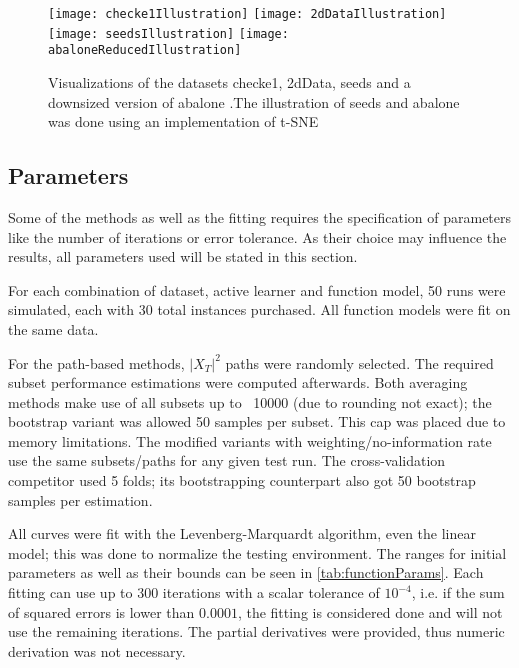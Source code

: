 \begin{figure}[h]
	\centering
	\texttt{[image: checke1Illustration]}
	\texttt{[image: 2dDataIllustration]}
	\texttt{[image: seedsIllustration]}
	\texttt{[image: abaloneReducedIllustration]}
	\caption{Visualizations of the datasets checke1, 2dData, seeds and a downsized version of abalone \cite{Chapelle2005,KremplEtAl2014,CharytanowiczEtAl2010,NashEtAl1994}.\newline The illustration of seeds and abalone was done using an implementation of t-SNE \cite{vanDerMaaten2008}}
	\label{fig:datasetIllustrations}
\end{figure}

\subsection{Parameters}

Some of the methods as well as the fitting requires the specification of parameters like the number of iterations or error tolerance. As their choice may influence the results, all parameters used will be stated in this section.

For each combination of dataset, active learner and function model, 50 runs were simulated, each with 30 total instances purchased. All function models were fit on the same data.

For the path-based methods, $|X_T|^2$ paths were randomly selected. The required subset performance estimations were computed afterwards. Both averaging methods make use of all subsets up to ~10000 (due to rounding not exact); the bootstrap variant was allowed 50 samples per subset. This cap was placed due to memory limitations. The modified variants with weighting/no-information rate use the same subsets/paths for any given test run. The cross-validation competitor used 5 folds; its bootstrapping counterpart also got 50 bootstrap samples per estimation.

All curves were fit with the Levenberg-Marquardt algorithm, even the linear model; this was done to normalize the testing environment. The ranges for initial parameters as well as their bounds can be seen in \ref{tab:functionParams}. Each fitting can use up to 300 iterations with a scalar tolerance of $10^{-4}$, i.e. if the sum of squared errors is lower than $0.0001$, the fitting is considered done and will not use the remaining iterations. The partial derivatives were provided, thus numeric derivation was not necessary.

